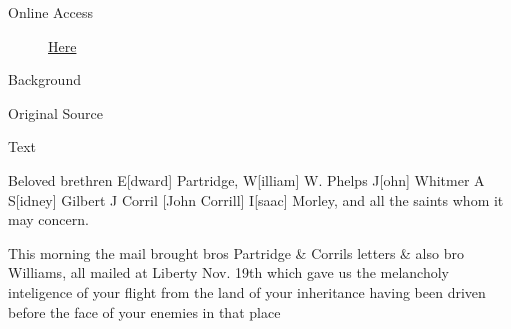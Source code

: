 			\begin{description}
				\item[Online Access] \href{https://www.josephsmithpapers.org/paper-summary/letter-to-edward-partridge-and-others-10-december-1833/1}{Here}
			\end{description}
			
			\begin{description}
				\item[Background]
			\end{description}
			
			
			\begin{description}
				\item[Original Source]
			\end{description}
			
			
			\begin{description}
				\item[Text]
			\end{description}
			
				
				Beloved brethren E[dward] Partridge, W[illiam] W. Phelps J[ohn] Whitmer A S[idney] Gilbert J Corril [John Corrill] I[saac] Morley, and all the saints whom it may concern.
				
				This morning the mail brought bros Partridge \& Corrils letters \& also bro Williams, all mailed at Liberty Nov. 19th which gave us the melancholy inteligence of your flight from the land of your inheritance having been driven before the face of your enemies in that place
				
